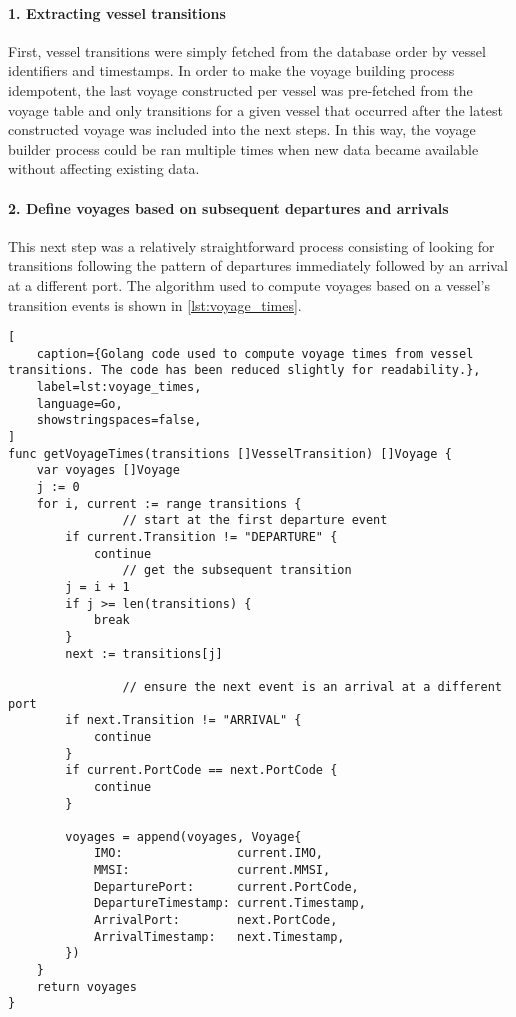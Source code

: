 \paragraph{1. Extracting vessel transitions}

First, vessel transitions were simply fetched from the database order by vessel identifiers and timestamps. In order to make the voyage building process idempotent, the last voyage constructed per vessel was pre-fetched from the voyage table and only transitions for a given vessel that occurred after the latest constructed voyage was included into the next steps. In this way, the voyage builder process could be ran multiple times when new data became available without affecting existing data.

\paragraph{2. Define voyages based on subsequent departures and arrivals}

This next step was a relatively straightforward process consisting of looking for transitions following the pattern of departures immediately followed by an arrival at a different port. The algorithm used to compute voyages based on a vessel's transition events is shown in \cref{lst:voyage_times}.

\begin{lstlisting}[
    caption={Golang code used to compute voyage times from vessel transitions. The code has been reduced slightly for readability.},
    label=lst:voyage_times,
    language=Go,
    showstringspaces=false,
]
func getVoyageTimes(transitions []VesselTransition) []Voyage {
	var voyages []Voyage
	j := 0
	for i, current := range transitions {
                // start at the first departure event
		if current.Transition != "DEPARTURE" {
			continue
                // get the subsequent transition
		j = i + 1
		if j >= len(transitions) {
			break
		}
		next := transitions[j]

                // ensure the next event is an arrival at a different port
		if next.Transition != "ARRIVAL" {
			continue
		}
		if current.PortCode == next.PortCode {
			continue
		}

		voyages = append(voyages, Voyage{
			IMO:                current.IMO,
			MMSI:               current.MMSI,
			DeparturePort:      current.PortCode,
			DepartureTimestamp: current.Timestamp,
			ArrivalPort:        next.PortCode,
			ArrivalTimestamp:   next.Timestamp,
		})
	}
	return voyages
}
\end{lstlisting}

